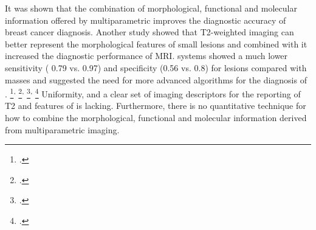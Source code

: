 It was shown that the combination of morphological, functional and molecular
information offered by multiparametric \mri improves the diagnostic accuracy of
breast cancer diagnosis.  Another study showed that T2-weighted imaging can
better represent the morphological features of small lesions
\cite{wu2014diffusion}
and combined with \dwi it increased the diagnostic performance of MRI.  \cad
systems showed a much lower sensitivity ( 0.79 vs.
0.97) and specificity (0.56 vs. 0.8) for \nmle lesions compared with masses and
suggested the need for more advanced algorithms for the diagnosis of \nmle.
\footcite{jansen2008dcemri}\textsuperscript{,}
\footcite{jansen2011ductal}\textsuperscript{,}
\footcite{liu2013intravoxel}\textsuperscript{,}
\footcite{newell2010selection}
Uniformity, and a clear set of
imaging descriptors for the reporting of T2 and \dwi features of \nmle is
lacking. Furthermore, there is no quantitative technique for how to combine the
morphological, functional and molecular information derived from
multiparametric imaging.








